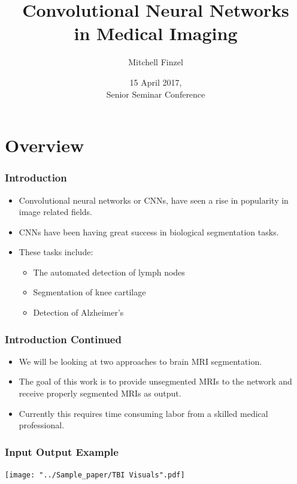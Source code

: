 \documentclass{beamer}
\title[CNNs in Medical Imaging]{Convolutional Neural Networks \\ in Medical Imaging}
\author[Finzel]{Mitchell Finzel}
\institute[U of Minn, Morris]
{
  Division of Science and Mathematics \\
  University of Minnesota, Morris \\
  Morris, Minnesota, USA
}
\date[April '17] %
{15 April 2017, \\ Senior Seminar Conference}
\begin{document}
\begin{frame}
  \titlepage
\end{frame}


\section*{Overview}

\begin{frame}
  \frametitle{Introduction}
  \tableofcontents[hideallsubsections]
  \begin{itemize}
  	\item Convolutional neural networks or CNNs, have seen a rise in popularity in image related fields.
  	\pause
  	\item CNNs have been having great success in biological segmentation tasks.
  	\pause
  	\item These tasks include:
  	\pause
  	\begin{itemize}
  	  \item The automated detection of lymph nodes
  	  \pause
  	  \item Segmentation of knee cartilage
  	  \pause
  	  \item Detection of Alzheimer's
  	\end{itemize}
  \end{itemize}
\end{frame}

\begin{frame}
  \frametitle{Introduction Continued}
  \tableofcontents[hideallsubsections]
  \begin{itemize}
	\item We will be looking at two approaches to brain MRI segmentation.
	\pause
	\item The goal of this work is to provide unsegmented MRIs to the network and receive properly segmented MRIs as output.
	\pause
	\item Currently this requires time consuming labor from a skilled medical professional.
  \end{itemize}
\end{frame}

\begin{frame} 
	\frametitle{Input Output Example}
    \texttt{[image: "../Sample\_paper/TBI Visuals".pdf]}
\end{frame}
\end{document}

